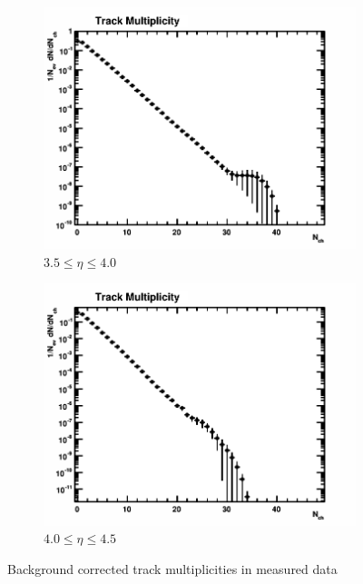 \begin{figure}[H]
\begin{subfigure}{0.32\textwidth}
		\includegraphics[width=\textwidth]{Chapters/multiplicity/images/background_corrected/real/3-5_4-0_norm.png}
		\caption{$3.5 \le \eta \le 4.0$}
	\end{subfigure}
	\begin{subfigure}{0.32\textwidth}
		\includegraphics[width=\textwidth]{Chapters/multiplicity/images/background_corrected/real/4-0_4-5_norm.png}
		\caption{$4.0 \le \eta \le 4.5$}
	\end{subfigure}
	\caption{Background corrected track multiplicities in measured data}
	\label{fig: background corrected track multiplicities}
\end{figure}


